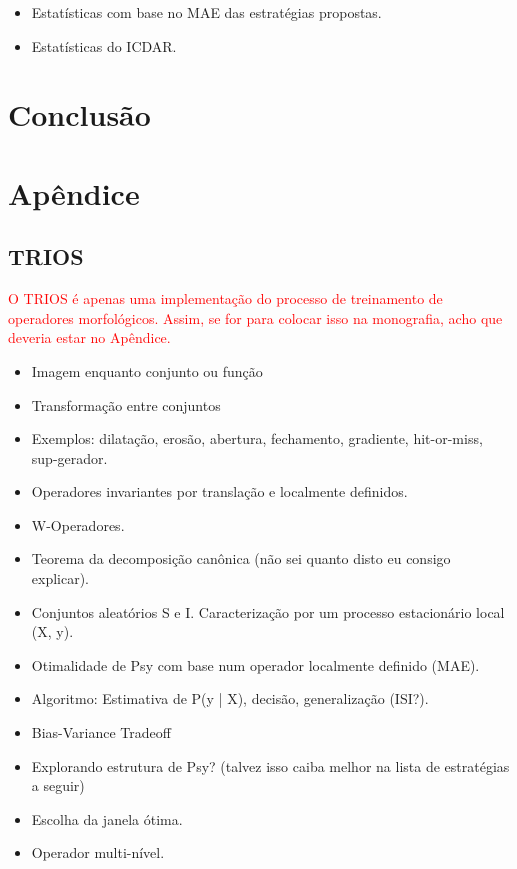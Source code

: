 \documentclass[a4paper,11pt]{article}
\newcommand{\TODO}[1]{\textcolor{red}{#1}}
\begin{document}
      \begin{itemize}
        \item Estatísticas com base no MAE das estratégias propostas.
        \item Estatísticas do ICDAR.
      \end{itemize}



\section{Conclusão}




\section{Apêndice}

\subsection{TRIOS}

\TODO{O TRIOS é apenas uma implementação do processo de treinamento de
  operadores morfológicos. Assim, se for para colocar isso na
  monografia, acho que deveria estar no Apêndice.}
      \begin{itemize}
        \item Imagem enquanto conjunto ou função
        \item Transformação entre conjuntos
        \item Exemplos: dilatação, erosão, abertura, fechamento, gradiente, hit-or-miss, sup-gerador.
        \item Operadores invariantes por translação e localmente definidos.
        \item W-Operadores.
        \item Teorema da decomposição canônica (não sei quanto disto eu consigo explicar).
        \item Conjuntos aleatórios S e I. Caracterização por um processo estacionário local (X, y).
        \item Otimalidade de Psy com base num operador localmente definido (MAE).
        \item Algoritmo: Estimativa de P(y | X), decisão, generalização (ISI?).
        \item Bias-Variance Tradeoff
        \item Explorando estrutura de Psy? (talvez isso caiba melhor na lista de estratégias a seguir)
        \item Escolha da janela ótima.
        \item Operador multi-nível.
      \end{itemize}
\end{document}
